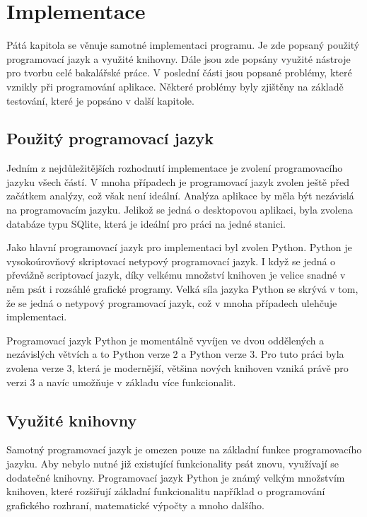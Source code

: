 \documentclass[thesis=B,czech]{resources/FITthesis}[2012/06/26]
\begin{document}
\chapter{Implementace}
Pátá kapitola se věnuje samotné implementaci programu. Je zde popsaný použitý programovací jazyk a využité knihovny.  Dále jsou zde popsány využité nástroje pro tvorbu celé bakalářské práce. V poslední části jsou popsané problémy, které vznikly při programování aplikace. Některé problémy byly zjištěny na základě testování, které je popsáno v další kapitole.

\section{Použitý programovací jazyk}
\label{programovaci_jazyk}
Jedním z nejdůležitějších rozhodnutí implementace je zvolení programovacího jazyku všech částí. V mnoha případech je programovací jazyk zvolen ještě před začátkem analýzy, což však není ideální. Analýza aplikace by měla být nezávislá na programovacím jazyku. Jelikož se jedná o desktopovou aplikaci, byla zvolena databáze typu SQlite, která je ideální pro práci na jedné stanici. \par

Jako hlavní programovací jazyk pro implementaci byl zvolen Python\cite{python3}. Python je vysokoúrovňový skriptovací netypový programovací jazyk. I když se jedná o převážně scriptovací jazyk, díky velkému množství knihoven je velice snadné v něm psát i rozsáhlé grafické programy. Velká síla jazyka Python se skrývá v tom, že se jedná o netypový programovací jazyk, což v mnoha případech ulehčuje implementaci. \par

Programovací jazyk Python je momentálně vyvíjen ve dvou oddělených a nezávislých větvích a to Python verze 2 a Python verze 3. Pro tuto práci byla zvolena verze 3, která je modernější, většina nových knihoven vzniká právě pro verzi 3 a navíc umožňuje v základu více funkcionalit.

\section{Využité knihovny}
Samotný programovací jazyk je omezen pouze na základní funkce programovacího jazyku. Aby nebylo nutné již existující funkcionality psát znovu, využívají se dodatečné knihovny. Programovací jazyk Python je známý velkým množstvím knihoven, které rozšiřují základní funkcionalitu například o programování grafického rozhraní, matematické výpočty a mnoho dalšího. 
\end{document}
